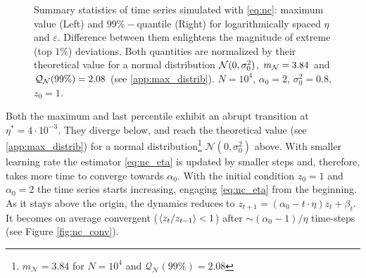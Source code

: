 \documentclass[FinalReport.tex]{subfiles}
\begin{document}
\begin{figure}[h!]
\centering
	\centering
	\caption{Summary statistics of time series simulated with \eqref{eq:nc}: maximum value (Left) and $99\%-$quantile (Right) for logarithmically spaced $\eta$ and $\varepsilon$. Difference between them enlightens the magnitude of extreme (top $1\%$) deviations. Both quantities are normalized by their theoretical value for a normal distribution $\mathcal{N}(0,\sigma_0^2)$, $m_{\mathcal{N}}=3.84$ and $\mathcal{Q}_{\mathcal{N}}(99\%)=2.08$ (see \autoref{app:max_distrib}). $N=10^4$, $\alpha_0=2$, $\sigma_0^2=0.8$, $z_0=1$.}
	\label{fig:quant_max}	
\end{figure}


Both the maximum and last percentile exhibit an abrupt transition at $\eta^*=4\cdot10^{-3}$. They diverge below, and reach the theoretical value (see \autoref{app:max_distrib}) for a normal distribution\footnote{$m_\mathcal{N}=3.84$ for $N=10^4$ and $\mathcal{Q}_\mathcal{N}(99\%)=2.08$} $\mathcal{N}(0,\sigma_0^2)$ above. With smaller learning rate the estimator \eqref{eq:nc_eta} is updated by smaller steps and, therefore, takes more time to converge towards $\alpha_0$. With the initial condition $z_0=1$ and $\alpha_0=2$ the time series starts increasing, engaging \eqref{eq:nc_eta} from the beginning. As it stays above the origin, the dynamics reduces to $z_{t+1}=(\alpha_0-t\cdot\eta)z_t+\beta_t$. It becomes on average convergent ($\expval{z_t/z_{t-1}}<1$) after $\sim(\alpha_0-1)/\eta$ time-steps (see Figure \ref{fig:nc_conv}).
\end{document}

